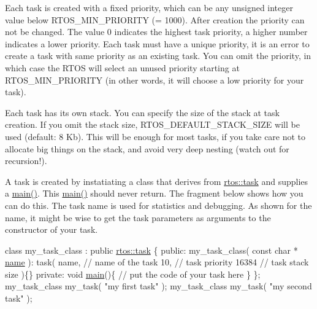 Each task is created with a fixed priority, which can be any unsigned integer value below R\+T\+O\+S\+\_\+\+M\+I\+N\+\_\+\+P\+R\+I\+O\+R\+I\+TY (= 1000). After creation the priority can not be changed. The value 0 indicates the highest task priority, a higher number indicates a lower priority. Each task must have a unique priority, it is an error to create a task with same priority as an existing task. You can omit the priority, in which case the R\+T\+OS will select an unused priority starting at R\+T\+O\+S\+\_\+\+M\+I\+N\+\_\+\+P\+R\+I\+O\+R\+I\+TY (in other words, it will choose a low priority for your task).

Each task has its own stack. You can specify the size of the stack at task creation. If you omit the stack size, R\+T\+O\+S\+\_\+\+D\+E\+F\+A\+U\+L\+T\+\_\+\+S\+T\+A\+C\+K\+\_\+\+S\+I\+ZE will be used (default\+: 8 Kb). This will be enough for most tasks, if you take care not to allocate big things on the stack, and avoid very deep nesting (watch out for recursion!).

A task is created by instatiating a class that derives from \hyperlink{classrtos_1_1task}{rtos\+::task} and supplies a \hyperlink{classrtos_1_1task__base_a67892c7e1f734e0a91baa5a4fc6dea27}{main()}. This \hyperlink{classrtos_1_1task__base_a67892c7e1f734e0a91baa5a4fc6dea27}{main()} should never return. The fragment below shows how you can do this. The task name is used for statistics and debugging. As shown for the name, it might be wise to get the task parameters as arguments to the constructor of your task.


\begin{DoxyCode}
\textcolor{keyword}{class }my\_task\_class : \textcolor{keyword}{public} \hyperlink{classrtos_1_1task}{rtos::task} \{
\textcolor{keyword}{public}:
   my\_task\_class( \textcolor{keyword}{const} \textcolor{keywordtype}{char} * \hyperlink{classrtos_1_1task__base_a95a8550c6b1befe7ec8884b58fc818ee}{name} ):
      task(
         name,  \textcolor{comment}{// name of the task}
         10,    \textcolor{comment}{// task priority}
         16384  \textcolor{comment}{// task stack size}
      )\{\}
\textcolor{keyword}{private}:
   \textcolor{keywordtype}{void} \hyperlink{classrtos_1_1task__base_a67892c7e1f734e0a91baa5a4fc6dea27}{main}()\{
      \textcolor{comment}{// put the code of your task here}
   \}
\};
my\_task\_class my\_task( \textcolor{stringliteral}{"my first task"} );
my\_task\_class my\_task( \textcolor{stringliteral}{"my second task"} );
\end{DoxyCode}


